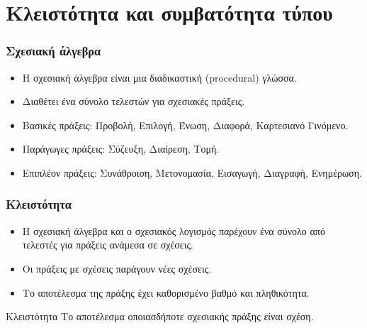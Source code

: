 
\section[\textgreek{Κλειστότητα}]{\textgreek{Κλειστότητα και συμβατότητα τύπου}}


\begin{frame}
\frametitle{Σχεσιακή άλγεβρα}
\begin{minipage}{\wE}
  \large
  \begin{itemize}{\itemsep9pt}
    \item Η {\crr σχεσιακή άλγεβρα} είναι μια διαδικαστική ({\en procedural}) γλώσσα.
    \item Διαθέτει ένα σύνολο τελεστών για σχεσιακές πράξεις.
    \item Βασικές πράξεις: Προβολή, Επιλογή, Ένωση, Διαφορά, Καρτεσιανό Γινόμενο.
    \item Παράγωγες πράξεις: Σύζευξη, Διαίρεση, Τομή.
    \item Επιπλέον πράξεις: Συνάθροιση, Μετονομασία, Εισαγωγή, Διαγραφή, Ενημέρωση.
  \end{itemize}
\end{minipage}
\end{frame}

\begin{frame}
\frametitle{Κλειστότητα}
\begin{minipage}{\wE}
  \large
  \begin{itemize}{\itemsep6pt}
    \item Η {\crr σχεσιακή άλγεβρα} και ο σχεσιακός λογισμός παρέχουν
          ένα σύνολο από τελεστές για πράξεις ανάμεσα σε σχέσεις.
    \item Οι πράξεις με σχέσεις παράγουν νέες σχέσεις.
    \item Το αποτέλεσμα της πράξης έχει καθορισμένο {\cbb βαθμό} και {\cbb πληθικότητα}.
  \end{itemize}
  \begin{block}{Κλειστότητα}
    Tο αποτέλεσμα οποιασδήποτε σχεσιακής πράξης είναι {\crr σχέση}.
  \end{block}
\end{minipage}
\end{frame}




